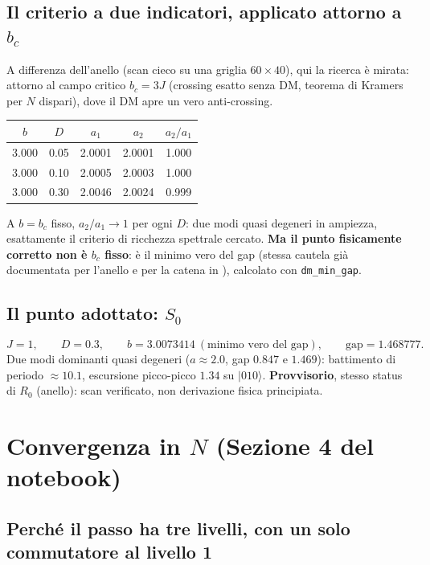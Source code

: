 \documentclass[11pt,a4paper]{article}
\newcommand{\ket}[1]{\lvert #1 \rangle}
\begin{document}
\subsection{Il criterio a due indicatori, applicato attorno a $b_c$}

A differenza dell'anello (scan cieco su una griglia $60\times40$), qui la ricerca è mirata: attorno al campo critico $b_c=3J$ (crossing esatto senza DM, teorema di Kramers per $N$ dispari), dove il DM apre un vero anti-crossing.

\begin{center}
\begin{tabular}{@{}ccccc@{}}
\toprule
$b$ & $D$ & $a_1$ & $a_2$ & $a_2/a_1$ \\
\midrule
3.000 & 0.05 & 2.0001 & 2.0001 & 1.000 \\
3.000 & 0.10 & 2.0005 & 2.0003 & 1.000 \\
3.000 & 0.30 & 2.0046 & 2.0024 & 0.999 \\
\bottomrule
\end{tabular}
\end{center}
A $b=b_c$ fisso, $a_2/a_1\to1$ per ogni $D$: due modi quasi degeneri in ampiezza, esattamente il criterio di ricchezza spettrale cercato. \textbf{Ma il punto fisicamente corretto non è $b_c$ fisso}: è il minimo vero del gap (stessa cautela già documentata per l'anello e per la catena in \texttt{}), calcolato con \texttt{dm\_min\_gap}.

\subsection{Il punto adottato: $S_0$}

$$J=1, \qquad D=0.3, \qquad b=3.0073414 \ (\text{minimo vero del gap}), \qquad \text{gap}=1.468777.$$
Due modi dominanti quasi degeneri (\(a\approx2.0\), gap $0.847$ e $1.469$): battimento di periodo $\approx10.1$, escursione picco-picco $1.34$ su $\ket{010}$. \textbf{Provvisorio}, stesso status di $R_0$ (anello): scan verificato, non derivazione fisica principiata.

\section{Convergenza in $N$ (Sezione 4 del notebook)}
\label{sec:conv}

\subsection{Perché il passo ha tre livelli, con un solo commutatore al livello 1}
\end{document}
